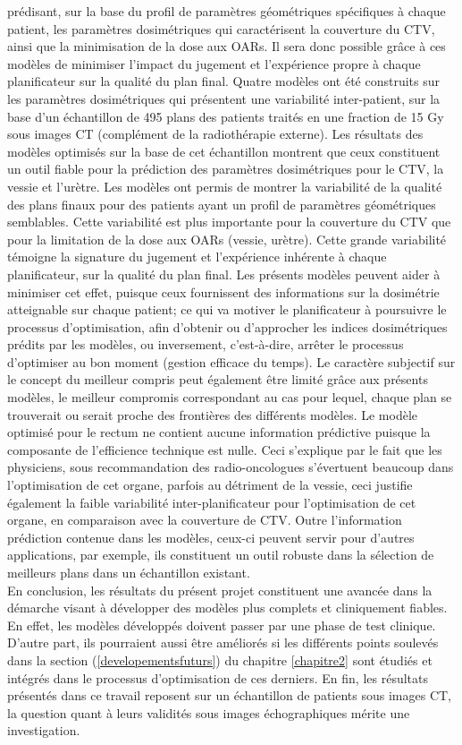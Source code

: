 prédisant, sur la base du profil de paramètres géométriques spécifiques à chaque patient, les paramètres dosimétriques qui caractérisent la couverture du CTV, ainsi que la minimisation de la dose aux OARs. Il sera donc possible grâce à ces modèles de minimiser l’impact du jugement et l’expérience propre à chaque planificateur sur la qualité du plan final. Quatre modèles ont été construits sur les paramètres dosimétriques qui présentent une variabilité inter-patient, sur la base d’un échantillon de 495 plans des patients traités en une fraction de 15 Gy sous images CT (complément de la radiothérapie externe).
Les résultats des modèles optimisés sur la base de cet échantillon montrent que ceux constituent un outil fiable pour la prédiction des paramètres dosimétriques pour le CTV, la vessie et l’urètre. Les modèles ont permis de montrer la variabilité de la qualité des plans finaux pour des patients ayant un profil de paramètres géométriques semblables. Cette variabilité est plus importante pour la couverture du CTV que pour la limitation de la dose aux OARs (vessie, urètre). Cette grande variabilité témoigne la signature du jugement et l’expérience inhérente à chaque planificateur, sur la qualité du plan final. Les présents modèles peuvent aider à minimiser cet effet, puisque ceux fournissent des informations sur la dosimétrie atteignable sur chaque patient; ce qui va motiver le planificateur à poursuivre le processus d’optimisation, afin d’obtenir ou d'approcher les indices dosimétriques prédits par les modèles, ou inversement, c’est-à-dire, arrêter le processus d’optimiser au bon moment (gestion efficace du temps). Le caractère subjectif sur le concept du meilleur compris peut également être limité grâce aux présents modèles, le meilleur compromis correspondant au cas pour lequel, chaque plan se trouverait ou serait proche des frontières des différents modèles. Le modèle optimisé pour le rectum ne contient aucune information prédictive puisque la composante de l’efficience technique est nulle. Ceci s’explique par le fait que les physiciens, sous recommandation des radio-oncologues s’évertuent beaucoup dans l’optimisation de cet organe, parfois au détriment de la vessie, ceci justifie également la faible variabilité inter-planificateur pour l’optimisation de cet organe, en comparaison avec la couverture de CTV. Outre l’information prédiction contenue dans les modèles, ceux-ci peuvent servir pour d’autres applications, par exemple, ils constituent un outil robuste dans la sélection de meilleurs plans dans un échantillon existant. \\
En conclusion, les résultats du présent projet constituent une avancée dans la démarche visant à développer des modèles plus complets et cliniquement fiables. En effet, les modèles développés doivent passer par une phase de test clinique. D’autre part, ils pourraient aussi être améliorés si les différents points soulevés dans la section (\ref{developementsfuturs}) du chapitre \ref{chapitre2} sont étudiés et intégrés dans le processus d’optimisation de ces derniers. En fin, les résultats présentés dans ce travail reposent sur un échantillon de patients sous images CT, la question quant à leurs validités sous images échographiques mérite une investigation. 